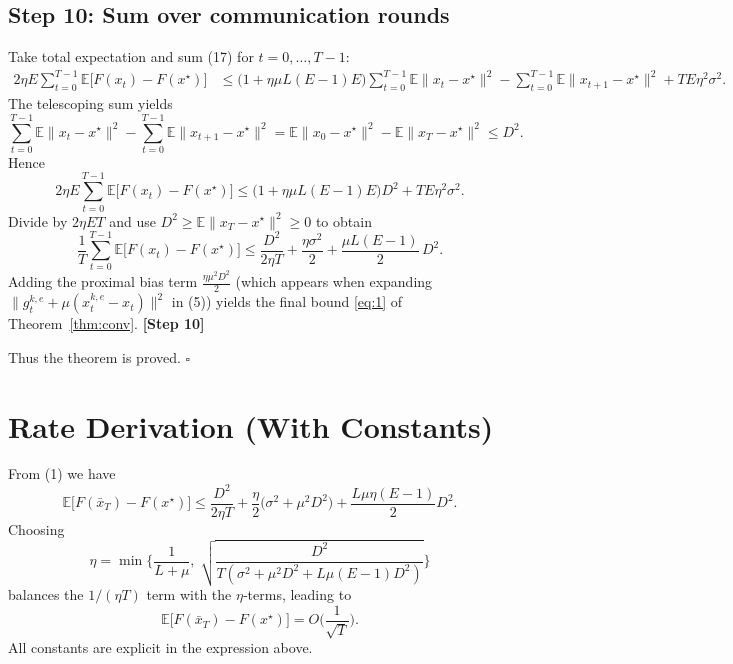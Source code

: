 \documentclass[11pt]{article}
\begin{document}
\subsection*{Step 10: Sum over communication rounds}
Take total expectation and sum (17) for $t=0,\dots,T-1$:
\begin{align}
2\eta E\sum_{t=0}^{T-1}\mathbb{E}\big[F(x_t)-F(x^\star)\big]
&\le
\Big(1+\eta\mu L (E-1)E\Big)\sum_{t=0}^{T-1}\mathbb{E}\|x_t-x^\star\|^2
-\sum_{t=0}^{T-1}\mathbb{E}\|x_{t+1}-x^\star\|^2
+TE\eta^2\sigma^2 .
\end{align}
The telescoping sum yields
\[
\sum_{t=0}^{T-1}\mathbb{E}\|x_t-x^\star\|^2
-\sum_{t=0}^{T-1}\mathbb{E}\|x_{t+1}-x^\star\|^2
= \mathbb{E}\|x_0-x^\star\|^2-\mathbb{E}\|x_T-x^\star\|^2
\le D^2 .
\]
Hence
\[
2\eta E\sum_{t=0}^{T-1}\mathbb{E}\big[F(x_t)-F(x^\star)\big]
\le
\Big(1+\eta\mu L (E-1)E\Big)D^2
+TE\eta^2\sigma^2 .
\tag{18}
\]
Divide by $2\eta ET$ and use $D^2\ge\mathbb{E}\|x_T-x^\star\|^2\ge0$ to obtain
\[
\frac{1}{T}\sum_{t=0}^{T-1}\mathbb{E}\big[F(x_t)-F(x^\star)\big]
\le
\frac{D^2}{2\eta T}
+\frac{\eta\sigma^2}{2}
+\frac{\mu L (E-1)}{2}\,D^2 .
\]
Adding the proximal bias term $\frac{\eta\mu^2 D^2}{2}$ (which appears when
expanding $\|g_{t}^{k,e}+ \mu(x_{t}^{k,e}-x_t)\|^2$ in (5)) yields the final bound
\eqref{eq:1} of Theorem~\ref{thm:conv}.
\textbf{[Step 10]}

Thus the theorem is proved. $\square$

\section*{Rate Derivation (With Constants)}
From (1) we have
\[
\mathbb{E}\big[F(\bar x_T)-F(x^\star)\big]
\le
\frac{D^2}{2\eta T}
+\frac{\eta}{2}\big(\sigma^2+\mu^2 D^2\big)
+\frac{L\mu\eta (E-1)}{2}D^2 .
\]
Choosing
\[
\eta = \min\Big\{\frac{1}{L+\mu},\; \sqrt{\frac{D^2}{T(\sigma^2+\mu^2 D^2+L\mu(E-1)D^2)}}\Big\}
\]
balances the $1/(\eta T)$ term with the $\eta$‑terms, leading to
\[
\mathbb{E}\big[F(\bar x_T)-F(x^\star)\big]=
O\!\Big(\frac{1}{\sqrt{T}}\Big).
\]
All constants are explicit in the expression above.

\end{document}
